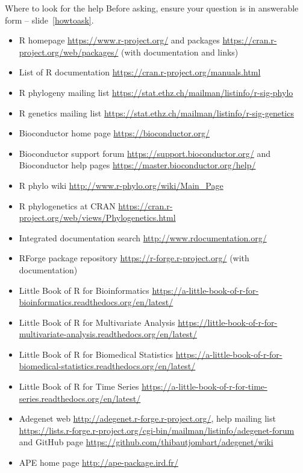\documentclass[compress, ucs, xelatex, 11pt, xcolor=svgnames,
  hyperref={
    bookmarks=true,
    unicode=true,
    colorlinks=true,
    pdftitle={Molecular data in R},
    plainpages=false,
    pdfauthor={Vojtech Zeisek},
    pdfsubject={Course about phylogeny and evolution in R},
    pdfcreator={XeLaTeX},
    pdfkeywords={R, evolution, phylogeny, molecular data},
    linkcolor=Tomato,
    anchorcolor=SaddleBrown,
    citecolor=Goldenrod,
    filecolor=DarkMagenta,
    menucolor=Sienna,
    urlcolor=DarkTurquoise,
    pdftex},
  url={hyphens, lowtilde} %
  ]{beamer}
\begin{document}
\begin{frame}[allowframebreaks]{Where to look for the help}
  \label{help}
  Before asking, \alert{ensure your question is in answerable form} -- slide~\ref{howtoask}.
  \begin{itemize}
    \item R homepage \url{https://www.r-project.org/} and packages \url{https://cran.r-project.org/web/packages/} (with documentation and links)
    \item List of R documentation \url{https://cran.r-project.org/manuals.html}
    \item R phylogeny mailing list \url{https://stat.ethz.ch/mailman/listinfo/r-sig-phylo}
    \item R genetics mailing list \url{https://stat.ethz.ch/mailman/listinfo/r-sig-genetics}
    \item Bioconductor home page \url{https://bioconductor.org/}
    \item Bioconductor support forum \url{https://support.bioconductor.org/} and Bioconductor help pages \url{https://master.bioconductor.org/help/}
    \item R phylo wiki \url{http://www.r-phylo.org/wiki/Main_Page}
    \item R phylogenetics at CRAN \url{https://cran.r-project.org/web/views/Phylogenetics.html}
    \item Integrated documentation search \url{http://www.rdocumentation.org/}
    \item RForge package repository \url{https://r-forge.r-project.org/} (with documentation)
    \item Little Book of R for Bioinformatics \url{https://a-little-book-of-r-for-bioinformatics.readthedocs.org/en/latest/}
    \item Little Book of R for Multivariate Analysis \url{https://little-book-of-r-for-multivariate-analysis.readthedocs.org/en/latest/}
    \item Little Book of R for Biomedical Statistics \url{https://a-little-book-of-r-for-biomedical-statistics.readthedocs.org/en/latest/}
    \item Little Book of R for Time Series \url{https://a-little-book-of-r-for-time-series.readthedocs.org/en/latest/}
    \item Adegenet web \url{http://adegenet.r-forge.r-project.org/}, help mailing list \url{https://lists.r-forge.r-project.org/cgi-bin/mailman/listinfo/adegenet-forum} and GitHub page \url{https://github.com/thibautjombart/adegenet/wiki}
    \item APE home page \url{http://ape-package.ird.fr/}

\end{itemize}
\end{frame}
\end{document}
